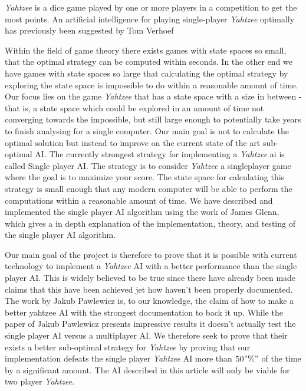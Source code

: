 \emph{Yahtzee} is a dice game played by one or more players in a competition to get the most points.
An artificial intelligence for playing single-player \emph{Yahtzee} optimally has previously been suggested by Tom Verhoef

Within the field of game theory there exists games with state spaces so small, that the optimal strategy can be computed within seconds. In the other end we have games with state spaces so large that calculating the optimal strategy by exploring the state space is impossible to do within a reasonable amount of time. Our focus lies on the game \emph{Yahtzee} that has a state space with a size in between - that is, a state space which could be explored in an amount of time not converging towards the impossible, but still large enough to potentially take years to finish analysing for a single computer. Our main goal is not to calculate the optimal solution but instead to improve on the current state of the art sub-optimal AI. The currently strongest strategy for implementing a \emph{Yahtzee} ai is called Single player AI. The strategy is to consider \emph{Yahtzee} a singleplayer game where the goal is to maximize your score. The state space for calculating this strategy is small enough that any modern computer will be able to perform the computations within a reasonable amount of time. We have described and implemented the single player AI algorithm using the work of James Glenn\cite{glenn2006optimal}, which gives a in depth explanation of the implementation, theory, and testing of the single player AI algorithm.

Our main goal of the project is therefore to prove that it is possible with current technology to implement a \emph{Yahtzee} AI with a better performance than the single player AI. This is widely believed to be true since there have already been made claims that this have been achieved jet how haven't been properly documented. The work by Jakub Pawlewicz is, to our knowledge, the claim of how to make a  better yahtzee AI with the strongest documentation to back it up. While the paper of Jakub Pawlewicz\citep{pawlewicz2011nearly} presents impressive results it doesn't actually test the single player AI versus a multiplayer AI. We therefore seek to prove that their exists a better sub-optimal strategy for \emph{Yahtzee} by proving that our implementation defeats the single player \emph{Yahtzee} AI more than $50"\%" $ of the time by a significant amount. The AI described in this article will only be viable for two player \emph{Yahtzee}.

